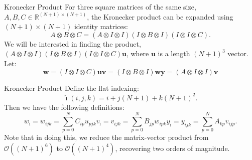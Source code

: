 \begin{frame}{Kronecker Product}
  For three square matrices of the same size, $A, B, C\in \mathbb{R}^{(N+1) \times (N+1)}$, the Kronecker product can be expanded using $(N+1)\times (N+1)$ identity matrices:
  \begin{equation}
    A\otimes B\otimes C=\left(A\otimes I\otimes I\right)\left(I\otimes B\otimes I\right)\left(I\otimes I\otimes C\right).
  \end{equation}
  We will be interested in finding the product, $\left(A\otimes I\otimes I\right)\left(I\otimes B\otimes I\right)\left(I\otimes I\otimes C\right)\mathbf{u}$, where $\mathbf{u}$ is a length $(N+1)^3$ vector.
  Let:
  \begin{subequations}
    \begin{equation}
      \mathbf{w}  =\left(I\otimes I\otimes C\right)\mathbf{u}
    \end{equation}
    \begin{equation}
      \mathbf{v}  =\left(I\otimes B\otimes I\right)\mathbf{w}
    \end{equation}
    \begin{equation}
      \mathbf{y}  =\left(A\otimes I\otimes I\right)\mathbf{v}
    \end{equation}
  \end{subequations}
\end{frame}

\begin{frame}{Kronecker Product}
  Define the flat indexing:
  \begin{equation}
    \hat{\imath} (i,j,k)=i+j(N+1)+k(N+1)^2.
  \end{equation}
  Then we have the following definitions:
  \begin{subequations}
    \begin{equation}
      w_{\hat{\imath}}= w_{ijk}=\sum_{p=0}^{N}C_{ip}u_{pjk}
    \end{equation}
    \begin{equation}
      v_{\hat{\imath}}=v_{ijk}=\sum_{p=0}^{N}B_{jp}w_{ipk}
    \end{equation}
    \begin{equation}
      y_{\hat{\imath}}=y_{ijk}=\sum_{p=0}^{N}A_{kp}v_{ijp}.
    \end{equation}
  \end{subequations}
  Note that in doing this, we reduce the matrix-vector product from $\mathcal{O}\left((N+1)^6\right)$ to $\mathcal{O}\left((N+1)^4\right)$, recovering two orders of magnitude.
\end{frame}